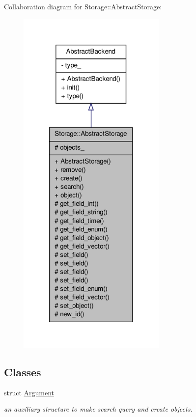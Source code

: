 Collaboration diagram for Storage::AbstractStorage:
\nopagebreak
\begin{figure}[H]
\begin{center}
\leavevmode
\includegraphics[width=206pt]{db/d69/classStorage_1_1AbstractStorage__coll__graph}
\end{center}
\end{figure}
\subsection*{Classes}
\begin{DoxyCompactItemize}
\item 
struct \hyperlink{structStorage_1_1AbstractStorage_1_1Argument}{Argument}
\begin{DoxyCompactList}\small\item\em an auxiliary structure to make search query and create objects. \item\end{DoxyCompactList}\end{DoxyCompactItemize}
